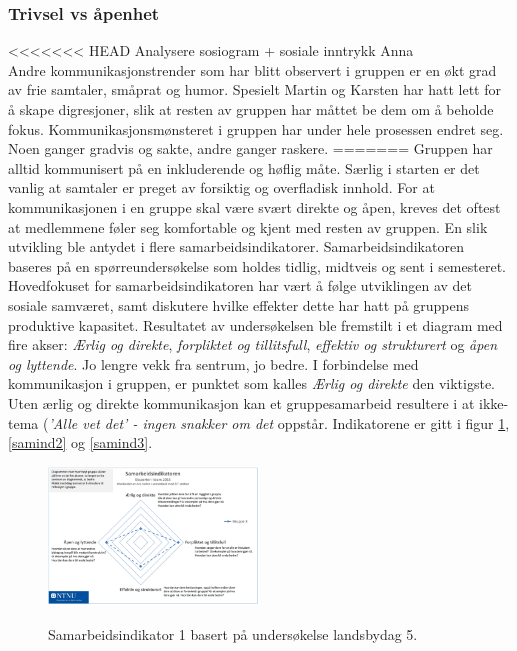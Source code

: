 \subsubsection{Trivsel vs åpenhet}

<<<<<<< HEAD
Analysere sosiogram + sosiale inntrykk Anna \\

Andre kommunikasjonstrender som har blitt observert i gruppen er en økt grad av frie samtaler, småprat og humor. Spesielt Martin og Karsten har hatt lett for å skape digresjoner, slik at resten av gruppen har måttet be dem om å beholde fokus. 
Kommunikasjonsmønsteret i gruppen har under hele prosessen endret seg.
Noen ganger gradvis og sakte, andre ganger raskere.
=======
Gruppen har alltid kommunisert på en inkluderende og høflig måte. 
Særlig i starten er det vanlig at samtaler er preget av forsiktig og overfladisk innhold. 
For at kommunikasjonen i en gruppe skal være svært direkte og åpen, kreves det oftest at medlemmene føler seg komfortable og kjent med resten av gruppen. 
En slik utvikling ble antydet i flere samarbeidsindikatorer. 
Samarbeidsindikatoren baseres på en spørreundersøkelse som holdes tidlig, midtveis og sent i semesteret. \\

Hovedfokuset for samarbeidsindikatoren har vært å følge utviklingen av det sosiale samværet, samt diskutere hvilke effekter dette har hatt på gruppens produktive kapasitet. Resultatet av undersøkelsen ble fremstilt i et diagram med fire akser: \textit{Ærlig og direkte}, \textit{forpliktet og tillitsfull}, \textit{effektiv og strukturert} og \textit{åpen og lyttende}. Jo lengre vekk fra sentrum, jo bedre. I forbindelse med kommunikasjon i gruppen, er punktet som kalles \textit{Ærlig og direkte} den viktigste. Uten ærlig og direkte kommunikasjon kan et gruppesamarbeid resultere i at ikke-tema (\textit{'Alle vet det' - ingen snakker om det} oppstår. Indikatorene er gitt i figur \ref{samind1}, \ref{samind2} og \ref{samind3}.

\begin{figure}[h!]
  \caption{Samarbeidsindikator 1 basert på undersøkelse landsbydag 5.}
  \centering
    \includegraphics[width=0.5\textwidth]{Bilder/samarbeidsindikator1.png}
    \label{samind1}
\end{figure}

